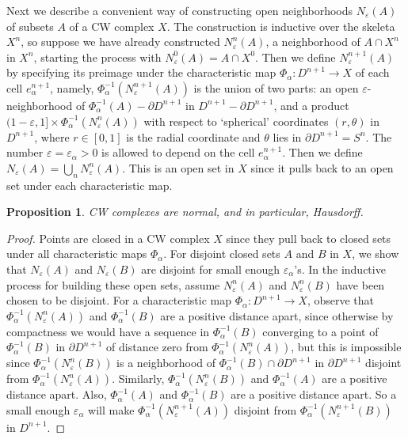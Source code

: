 \documentclass{article}
\newtheorem{proposition}[theorem]{Proposition}
\theoremstyle{definition}
\begin{document}
Next we describe a convenient way of constructing open neighborhoods $N_\varepsilon(A)$ of subsets $A$ of a CW complex $X$. The construction is inductive over the skeleta $X^n$, so suppose we have already constructed $N_\varepsilon^n(A)$, a neighborhood of $A \cap X^n$ in $X^n$, starting the process with $N_\varepsilon^0(A) = A \cap X^0$. Then we define $N_\varepsilon^{n+1}(A)$ by specifying its preimage under the characteristic map $\Phi_\alpha: D^{n+1} \to X$ of each cell $e_\alpha^{n+1}$, namely, $\Phi_\alpha^{-1}(N_\varepsilon^{n+1}(A))$ is the union of two parts: an open $\varepsilon$-neighborhood of $\Phi_\alpha^{-1}(A) - \partial D^{n+1}$ in $D^{n+1} - \partial D^{n+1}$, and a product $(1 - \varepsilon, 1] \times \Phi_\alpha^{-1}(N_\varepsilon^n(A))$ with respect to `spherical' coordinates $(r, \theta)$ in $D^{n+1}$, where $r \in [0, 1]$ is the radial coordinate and $\theta$ lies in $\partial D^{n+1} = S^n$. The number $\varepsilon = \varepsilon_\alpha > 0$ is allowed to depend on the cell $e_\alpha^{n+1}$. Then we define $N_\varepsilon(A) = \bigcup_n N_\varepsilon^n(A)$. This is an open set in $X$ since it pulls back to an open set under each characteristic map.

\begin{proposition}
CW complexes are normal, and in particular, Hausdorff.
\end{proposition}

\begin{proof}
Points are closed in a CW complex $X$ since they pull back to closed sets under all characteristic maps $\Phi_\alpha$. For disjoint closed sets $A$ and $B$ in $X$, we show that $N_\varepsilon(A)$ and $N_\varepsilon(B)$ are disjoint for small enough $\varepsilon_\alpha$'s. In the inductive process for building these open sets, assume $N_\varepsilon^n(A)$ and $N_\varepsilon^n(B)$ have been chosen to be disjoint. For a characteristic map $\Phi_\alpha: D^{n+1} \to X$, observe that $\Phi_\alpha^{-1}(N_\varepsilon^n(A))$ and $\Phi_\alpha^{-1}(B)$ are a positive distance apart, since otherwise by compactness we would have a sequence in $\Phi_\alpha^{-1}(B)$ converging to a point of $\Phi_\alpha^{-1}(B)$ in $\partial D^{n+1}$ of distance zero from $\Phi_\alpha^{-1}(N_\varepsilon^n(A))$, but this is impossible since $\Phi_\alpha^{-1}(N_\varepsilon^n(B))$ is a neighborhood of $\Phi_\alpha^{-1}(B) \cap \partial D^{n+1}$ in $\partial D^{n+1}$ disjoint from $\Phi_\alpha^{-1}(N_\varepsilon^n(A))$. Similarly, $\Phi_\alpha^{-1}(N_\varepsilon^n(B))$ and $\Phi_\alpha^{-1}(A)$ are a positive distance apart. Also, $\Phi_\alpha^{-1}(A)$ and $\Phi_\alpha^{-1}(B)$ are a positive distance apart. So a small enough $\varepsilon_\alpha$ will make $\Phi_\alpha^{-1}(N_\varepsilon^{n+1}(A))$ disjoint from $\Phi_\alpha^{-1}(N_\varepsilon^{n+1}(B))$ in $D^{n+1}$.
\end{proof}
\end{document}
